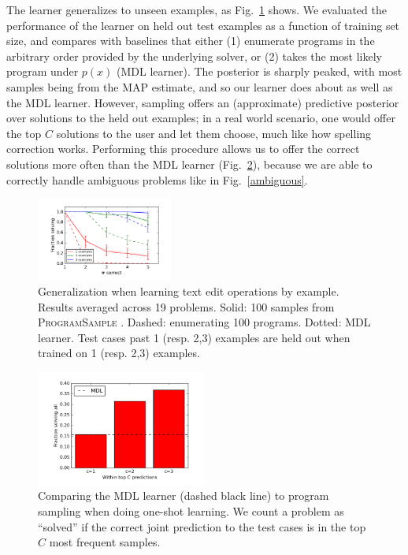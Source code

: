\documentclass{article}
\newcommand{\theSystem}{\textsc{ProgramSample}}
\begin{document}
The learner generalizes to unseen examples, as Fig.~\ref{flashPerformance} shows.
We evaluated the performance of the learner on held out test examples as a function of training set size, and compares with baselines that either (1) enumerate programs in the arbitrary order provided by the underlying solver,
or (2) takes the most likely program under $p(x)$ (MDL learner).
The posterior is sharply peaked,
with most samples being from the MAP estimate,
and so our learner does about as well as the MDL learner.
However,
sampling offers an (approximate) predictive posterior over solutions to the held out examples;
in a real world scenario, one would offer the top $C$ solutions to the user
and let them choose,
much like how spelling correction works.
Performing this procedure allows us to offer the correct solutions more often than the MDL learner (Fig.~\ref{mdl}), because we are able to correctly handle ambiguous problems like in Fig.~\ref{ambiguous}.
\begin{figure}\centering
  \includegraphics[width=0.4\textwidth]{fractionSolving.png}
  \caption{Generalization when learning text edit operations by example. Results averaged across 19 problems. Solid: 100 samples from \theSystem{} . Dashed: enumerating 100 programs. Dotted: MDL learner. Test cases past 1 (resp. 2,3) examples are held out when trained on 1 (resp. 2,3) examples.}\label{flashPerformance}
\end{figure}
 \begin{figure}
  \includegraphics[width=0.5\textwidth]{mdl.png}
  \caption{Comparing the MDL learner (dashed black line) to program sampling when doing one-shot learning. We count a problem as ``solved'' if  the correct joint prediction to the test cases is in the top $C$ most frequent samples.}\label{mdl}
  \end{figure}
\end{document}
